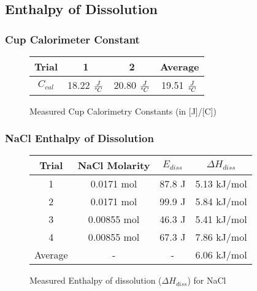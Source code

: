 \documentclass[12pt, letterpaper]{article}
\begin{document}
\subsection{Enthalpy of Dissolution}
\subsubsection{Cup Calorimeter Constant}
\FloatBarrier
\begin{figure}[h!]
	\begin{center}
	\renewcommand\arraystretch{1.5}
	\renewcommand\tabcolsep{12pt}
		\begin{tabular}{|c|c|c|c|}
			\hline 
			Trial & 1 & 2& Average \\
			\hline 
			$C_{cal}$ & 18.22 $\frac{J}{\textnormal{\textdegree} C}$  & 20.80 $\frac{J}{\textnormal{\textdegree} C}$& 19.51 $\frac{J}{\textnormal{\textdegree} C}$ \\
			\hline 
		\end{tabular}
	\end{center}
	\caption{Measured Cup Calorimetry Constants (in [J]/[\textdegree\space C])}
\end{figure}
\FloatBarrier
\subsubsection{NaCl Enthalpy of Dissolution}
\FloatBarrier
\begin{figure}[h!]
	\begin{center}
	\renewcommand\arraystretch{1.5}
	\renewcommand\tabcolsep{12pt}
		\begin{tabular}{|c|c|c|c|}
			\hline 
			Trial & NaCl Molarity & $E_{diss}$ & $\Delta H_{diss}$ \\
			\hline 
			1  & 0.0171 mol  & 87.8 J & 5.13 kJ/mol \\
			\hline
			2  & 0.0171 mol & 99.9 J  & 5.84 kJ/mol \\
			\hline
			3  & 0.00855 mol & 46.3 J  & 5.41 kJ/mol \\
			\hline
			4  & 0.00855 mol & 67.3 J & 7.86 kJ/mol  \\
			\hline 
			Average & - & - & 6.06 kJ/mol\\
			\hline
		\end{tabular}
	\end{center}
	\caption{Measured Enthalpy of dissolution ($\Delta H_{diss}$) for NaCl }
\end{figure}
\FloatBarrier
\end{document}
